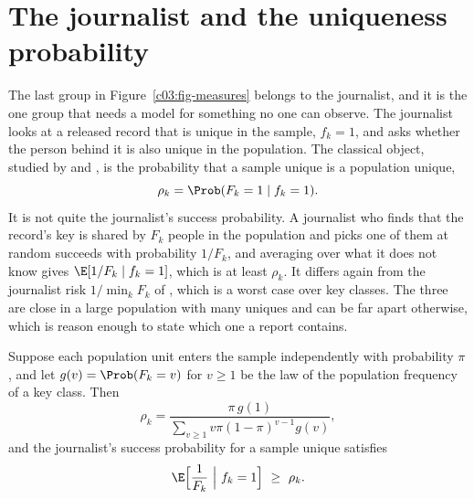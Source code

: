 \section{The journalist and the uniqueness probability}

The last group in Figure~\ref{c03:fig-measures} belongs to the journalist, and it is
the one group that needs a model for something no one can observe. The journalist looks
at a released record that is unique in the sample, $f_k = 1$, and asks whether the
person behind it is also unique in the population. The classical object, studied by
\citet{skinnerholmes1998} and \citet{skinner2002}, is the probability that a sample
unique is a population unique,
\begin{equation}\label{c03:eq-rhodef}
\rho_k = \Prob(F_k = 1 \mid f_k = 1).
\end{equation}
It is not quite the journalist's success probability. A journalist who finds that the
record's key is shared by $F_k$ people in the population and picks one of them at random
succeeds with probability $1/F_k$, and averaging over what it does not know gives
$\E[1/F_k \mid f_k = 1]$, which is at least $\rho_k$. It differs again from the
journalist risk $1/\min_k F_k$ of \citet{elemam2008}, which is a worst case over key
classes. The three are close in a large population with many uniques and can be far
apart otherwise, which is reason enough to state which one a report contains.

\begin{proposition}\label{c03:prop-rho}
Suppose each population unit enters the sample independently with probability $\pi$,
and let $g(v) = \Prob(F_k = v)$ for $v \ge 1$ be the law of the population frequency of a
key class. Then
\begin{equation}\label{c03:eq-rho}
\rho_k = \frac{\pi\, g(1)}{\sum_{v \ge 1} v\pi(1-\pi)^{v-1} g(v)},
\end{equation}
and the journalist's success probability for a sample unique satisfies
\begin{equation}\label{c03:eq-journ}
\E\Big[\frac{1}{F_k}\ \Big|\ f_k = 1\Big] \ \ge\ \rho_k .
\end{equation}
\end{proposition}

